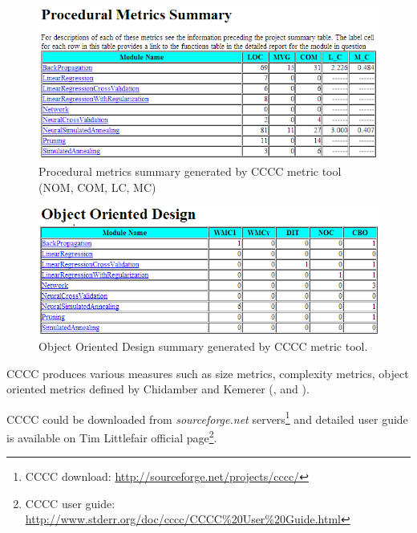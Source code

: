 \begin{figure}[h!]
	\centering
	\includegraphics[scale=0.6]{img/cccc1.png} 
	\caption{Procedural metrics summary generated by CCCC metric tool (\ac{NOM}, \ac{COM}, \ac{LC}, \ac{MC})}		
	\label{fig:cccc1}
\end{figure}

\begin{figure}[h!]
	\centering
	\includegraphics[scale=0.6]{img/cccc2.png} 
	\caption{Object Oriented Design summary generated by CCCC metric tool.}		
	\label{fig:cccc2}
\end{figure}

CCCC produces various measures such as size metrics, complexity metrics, object oriented metrics defined by Chidamber and Kemerer (\cite{indie}, \cite{vaxjo} and \cite{cccc1}).

CCCC could be downloaded from \textit{sourceforge.net} servers\footnote{CCCC download: \url{http://sourceforge.net/projects/cccc/}} and detailed user guide is available on Tim Littlefair official page\footnote{CCCC user guide: \url{http://www.stderr.org/doc/cccc/CCCC\%20User\%20Guide.html}}.

